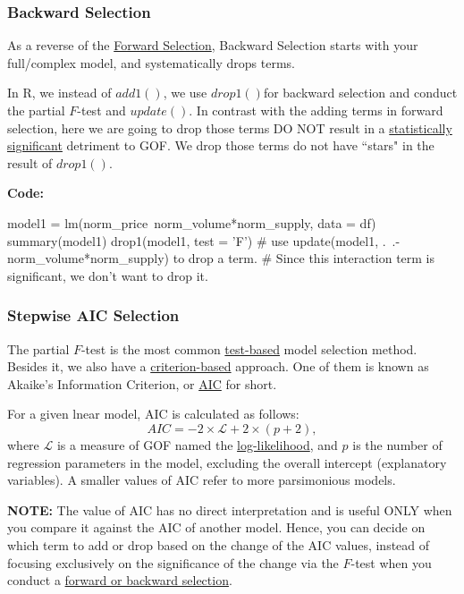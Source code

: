 \documentclass[12pt]{article}
\begin{document}
\subsubsection{Backward Selection}

As a reverse of the {\underline {Forward Selection}}, Backward Selection
starts with your full/complex model, and systematically drops terms.

In R, we instead of $ add1() $, we use $ drop1() $for backward 
selection and conduct the partial $ F $-test and $ update() $.
In contrast with the adding terms in forward selection, here we are
going to drop those terms DO NOT result in a {\underline {statistically
significant}} detriment to GOF.  We drop those terms do not have
``stars" in the result of $ drop1() $.


{\textbf {Code:}}
\begin{rc}
model1 = lm(norm_price~norm_volume*norm_supply, data = df)
summary(model1)
drop1(model1, test = 'F')
# use update(model1, .~.-norm_volume*norm_supply) to drop a term.
# Since this interaction term is significant, we don't want to drop it.
\end{rc}



\subsubsection{Stepwise AIC Selection}


The partial $ F $-test is the most common {\underline {test-based}}
model selection method.\\
Besides it, we also have a {\underline {criterion-based}} approach.
One of them is known as Akaike's Information Criterion, or 
{\underline {AIC}} for short.

For a given lnear model, AIC is calculated as follows:
\begin{equation*}
AIC =  - 2  \times \mathscr{L} + 2  \times (p + 2),
\end{equation*}
where $ \mathscr{L} $ is a measure of GOF named the 
{\underline {log-likelihood}}, and $ p $ is the number of regression
parameters in the model, excluding the overall intercept
(explanatory variables).
A smaller values of AIC refer to more parsimonious models.

{\textbf {NOTE:}} The value of AIC has no direct interpretation and
is useful ONLY when you compare it against the AIC of another model.
Hence, you can decide on which term to add or drop based on the change
of the AIC values, instead of focusing exclusively on the significance
of the change via the $ F $-test when you conduct a 
{\underline {forward or backward selection}}.\\
\end{document}
